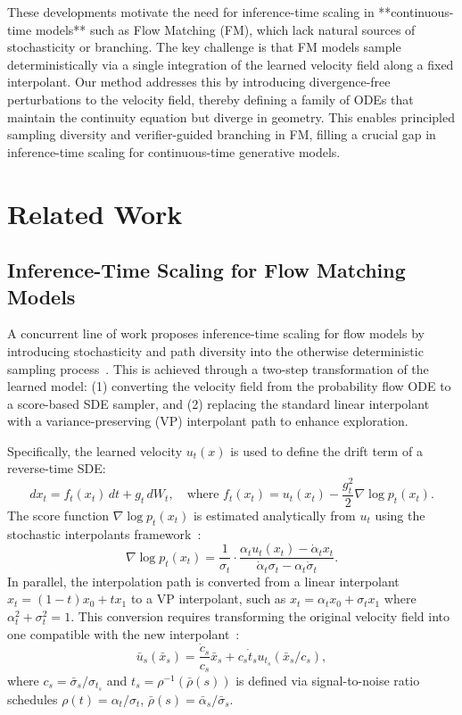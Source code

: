 \documentclass{article}
\begin{document}
These developments motivate the need for inference-time scaling in **continuous-time models** such as Flow Matching (FM), which lack natural sources of stochasticity or branching. The key challenge is that FM models sample deterministically via a single integration of the learned velocity field along a fixed interpolant. Our method addresses this by introducing divergence-free perturbations to the velocity field, thereby defining a family of ODEs that maintain the continuity equation but diverge in geometry. This enables principled sampling diversity and verifier-guided branching in FM, filling a crucial gap in inference-time scaling for continuous-time generative models.


\section{Related Work}
\label{sec:related}

\subsection{Inference-Time Scaling for Flow Matching Models}

A concurrent line of work proposes inference-time scaling for flow models by introducing stochasticity and path diversity into the otherwise deterministic sampling process~\cite{kim2025flowits}. This is achieved through a two-step transformation of the learned model: (1) converting the velocity field from the probability flow ODE to a score-based SDE sampler, and (2) replacing the standard linear interpolant with a variance-preserving (VP) interpolant path to enhance exploration.

Specifically, the learned velocity \( u_t(x) \) is used to define the drift term of a reverse-time SDE:
\[
d x_t = f_t(x_t)\,dt + g_t\,dW_t, \quad \text{where } f_t(x_t) = u_t(x_t) - \frac{g_t^2}{2} \nabla \log p_t(x_t).
\]
The score function \( \nabla \log p_t(x_t) \) is estimated analytically from \( u_t \) using the stochastic interpolants framework~\cite{ma2024sit}:
\[
\nabla \log p_t(x_t) = \frac{1}{\sigma_t} \cdot \frac{\alpha_t u_t(x_t) - \dot{\alpha}_t x_t}{\dot{\alpha}_t \sigma_t - \alpha_t \dot{\sigma}_t}.
\]
In parallel, the interpolation path is converted from a linear interpolant \( x_t = (1 - t)x_0 + t x_1 \) to a VP interpolant, such as \( x_t = \alpha_t x_0 + \sigma_t x_1 \) where \(\alpha_t^2 + \sigma_t^2 = 1\). This conversion requires transforming the original velocity field into one compatible with the new interpolant~\cite{kim2025flowits}:
\[
\bar{u}_s(\bar{x}_s) = \frac{\dot{c}_s}{c_s} \bar{x}_s + c_s \dot{t}_s u_{t_s}(\bar{x}_s / c_s),
\]
where \(c_s = \bar{\sigma}_s / \sigma_{t_s}\) and \(t_s = \rho^{-1}(\bar{\rho}(s))\) is defined via signal-to-noise ratio schedules \(\rho(t) = \alpha_t/\sigma_t\), \(\bar{\rho}(s) = \bar{\alpha}_s/\bar{\sigma}_s\).
\end{document}
